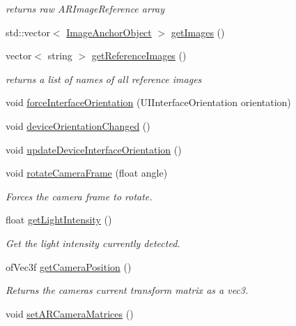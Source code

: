\begin{DoxyCompactItemize}
\begin{DoxyCompactList}\small\item\em returns raw A\+R\+Image\+Reference array \end{DoxyCompactList}\item 
std\+::vector$<$ \mbox{\hyperlink{struct_a_r_objects_1_1_image_anchor_object}{Image\+Anchor\+Object}} $>$ \mbox{\hyperlink{class_a_r_processor_aa21d943bcd4020fe98d7c9d1a9f14844}{get\+Images}} ()
\item 
vector$<$ string $>$ \mbox{\hyperlink{class_a_r_processor_a7a44fddbb4da117c40aa762368d92c54}{get\+Reference\+Images}} ()
\begin{DoxyCompactList}\small\item\em returns a list of names of all reference images \end{DoxyCompactList}\item 
void \mbox{\hyperlink{class_a_r_processor_a1100d09ed407ae8d1f4e95a9698e548d}{force\+Interface\+Orientation}} (U\+I\+Interface\+Orientation orientation)
\item 
void \mbox{\hyperlink{class_a_r_processor_ac065970f90243b08b9d004a4220d0345}{device\+Orientation\+Changed}} ()
\item 
void \mbox{\hyperlink{class_a_r_processor_a48797c1a249b2f115d0151396bc1eb9c}{update\+Device\+Interface\+Orientation}} ()
\item 
void \mbox{\hyperlink{class_a_r_processor_a2514281144c680e13c02562c74746ceb}{rotate\+Camera\+Frame}} (float angle)
\begin{DoxyCompactList}\small\item\em Forces the camera frame to rotate. \end{DoxyCompactList}\item 
float \mbox{\hyperlink{class_a_r_processor_a3e6d897db3a54b004f3eac337110765e}{get\+Light\+Intensity}} ()
\begin{DoxyCompactList}\small\item\em Get the light intensity currently detected. \end{DoxyCompactList}\item 
of\+Vec3f \mbox{\hyperlink{class_a_r_processor_a06030d617c338b3c395c48498733ddb7}{get\+Camera\+Position}} ()
\begin{DoxyCompactList}\small\item\em Returns the camera\textquotesingle{}s current transform matrix as a vec3. \end{DoxyCompactList}\item 
void \mbox{\hyperlink{class_a_r_processor_a2ffd8b9518388be29eba6affe4d4d152}{set\+A\+R\+Camera\+Matrices}} ()

\end{DoxyCompactItemize}
